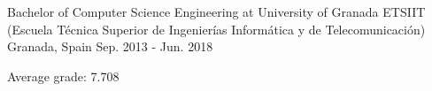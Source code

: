 

\begin{cventries}

  \cventry
    {Bachelor of Computer Science Engineering at University of Granada} %
    {ETSIIT (Escuela Técnica Superior de Ingenierías Informática y de Telecomunicación)} %
    {Granada, Spain} %
    {Sep. 2013 - Jun. 2018} %
    {
      \begin{cvitems} %
        \item {Average grade: 7.708}
      \end{cvitems}
    }

\end{cventries}

